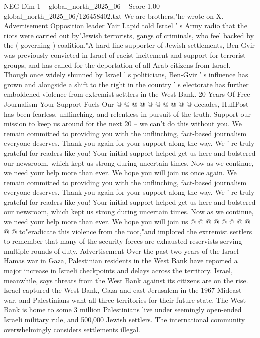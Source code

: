 \begin{textsample}{NEG Dim 1 – global\_north\_2025\_06 – Score 1.00 – global\_north\_2025\_06/126458402.txt}
We are brothers,"he wrote on X.
Advertisement Opposition leader Yair Lapid told Israel ' s Army radio that the riots were carried out by"Jewish terrorists, gangs of criminals, who feel backed by the ( governing ) coalition."A hard-line supporter of Jewish settlements, Ben-Gvir was previously convicted in Israel of racist incitement and support for terrorist groups, and has called for the deportation of all Arab citizens from Israel.
Though once widely shunned by Israel ' s politicians, Ben-Gvir ' s influence has grown and alongside a shift to the right in the country ' s electorate has further emboldened violence from extremist settlers in the West Bank. 20 Years Of Free Journalism Your Support Fuels Our @ @ @ @ @ @ @ @ @ @ decades, HuffPost has been fearless, unflinching, and relentless in pursuit of the truth.
Support our mission to keep us around for the next 20 -- we can't do this without you.
We remain committed to providing you with the unflinching, fact-based journalism everyone deserves.
Thank you again for your support along the way.
We ' re truly grateful for readers like you!
Your initial support helped get us here and bolstered our newsroom, which kept us strong during uncertain times.
Now as we continue, we need your help more than ever.
We hope you will join us once again.
We remain committed to providing you with the unflinching, fact-based journalism everyone deserves.
Thank you again for your support along the way.
We ' re truly grateful for readers like you!
Your initial support helped get us here and bolstered our newsroom, which kept us strong during uncertain times.
Now as we continue, we need your help more than ever.
We hope you will join us @ @ @ @ @ @ @ @ @ @ to"eradicate this violence from the root,"and implored the extremist settlers to remember that many of the security forces are exhausted reservists serving multiple rounds of duty.
Advertisement Over the past two years of the Israel-Hamas war in Gaza, Palestinian residents in the West Bank have reported a major increase in Israeli checkpoints and delays across the territory.
Israel, meanwhile, says threats from the West Bank against its citizens are on the rise.
Israel captured the West Bank, Gaza and east Jerusalem in the 1967 Mideast war, and Palestinians want all three territories for their future state.
The West Bank is home to some 3 million Palestinians live under seemingly open-ended Israeli military rule, and 500,000 Jewish settlers.
The international community overwhelmingly considers settlements illegal.

\end{textsample}
